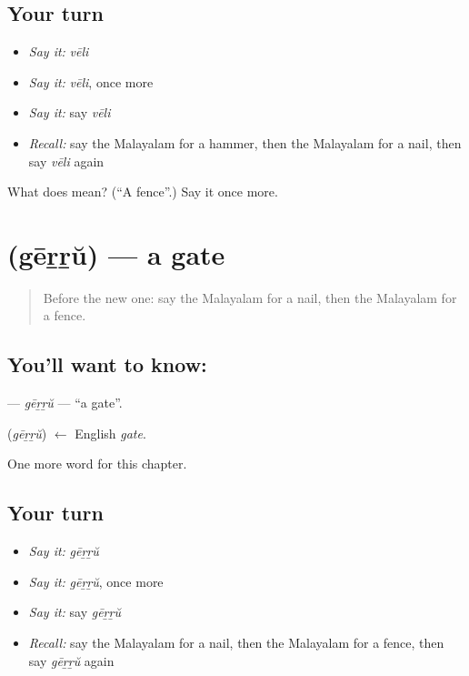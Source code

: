\subsection*{Your turn}
\begin{itemize}
\raggedright
  \item \emph{Say it:} \emph{vēli}
  \item \emph{Say it:} \emph{vēli}, once more
  \item \emph{Say it:} say \emph{vēli}
  \item \emph{Recall:} say the Malayalam for a hammer, then the Malayalam for a nail, then say \emph{vēli} again
\end{itemize}

\begin{tcolorbox}[breakable,colback=teal!4,colframe=teal!35!black,title={Before you move on}]
What does  mean? (\textquotedblleft{}A fence\textquotedblright{}.) Say it once more.
\end{tcolorbox}
\section[\texorpdfstring{\ml{ഗേറ്റ്} (gēṟṟŭ)}{ഗേറ്റ് (gēṟṟŭ)}]{ (gēṟṟŭ) — a gate}

\label{lesson:ML-C159-gerru}



\begin{quote}
Before the new one: say the Malayalam for a nail, then the Malayalam for a fence.
\end{quote}

\subsection*{You'll want to know: }
\textbf{} — \emph{gēṟṟŭ} — \textquotedblleft{}a gate\textquotedblright{}.

\begin{cousinweb}
\textbf{} (\emph{gēṟṟŭ}) $\leftarrow$ English \emph{gate}.
\end{cousinweb}

\begin{grammarlens}[title={What you've built}]
One more word for this chapter.
\end{grammarlens}

\subsection*{Your turn}
\begin{itemize}
\raggedright
  \item \emph{Say it:} \emph{gēṟṟŭ}
  \item \emph{Say it:} \emph{gēṟṟŭ}, once more
  \item \emph{Say it:} say \emph{gēṟṟŭ}
  \item \emph{Recall:} say the Malayalam for a nail, then the Malayalam for a fence, then say \emph{gēṟṟŭ} again
\end{itemize}

